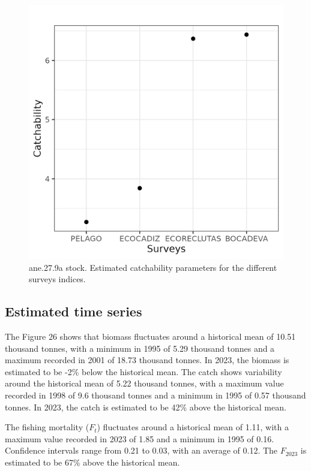 \documentclass[
]{article}
\begin{document}
\begin{figure}[H]

{\centering \includegraphics[width=0.95\linewidth]{report/run/S1.0_4FLEETS/fig_catchability} 

}

\caption{ane.27.9a stock. Estimated catchability parameters for the different surveys indices.}\label{fig:unnamed-chunk-33}
\end{figure}

\hypertarget{estimated-time-series}{%
\subsection{Estimated time series}\label{estimated-time-series}}

The Figure 26 shows that biomass fluctuates around a historical mean of
10.51 thousand tonnes, with a minimum in 1995 of 5.29 thousand tonnes
and a maximum recorded in 2001 of 18.73 thousand tonnes. In 2023, the
biomass is estimated to be -2\% below the historical mean. The catch
shows variability around the historical mean of 5.22 thousand tonnes,
with a maximum value recorded in 1998 of 9.6 thousand tonnes and a
minimum in 1995 of 0.57 thousand tonnes. In 2023, the catch is estimated
to be 42\% above the historical mean.

The fishing mortality (\(F_t\)) fluctuates around a historical mean of
1.11, with a maximum value recorded in 2023 of 1.85 and a minimum in
1995 of 0.16. Confidence intervals range from 0.21 to 0.03, with an
average of 0.12. The \(F_{2023}\) is estimated to be 67\% above the
historical mean.
\end{document}
